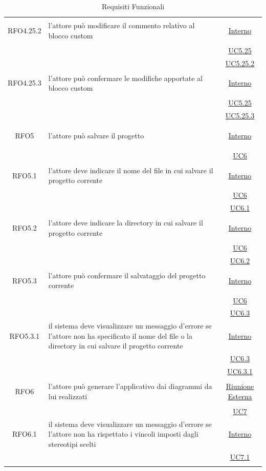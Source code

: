 \begin{longtable}{|c|>{\centering}m{7cm}|c|}
\hypertarget{RFO4.25.2}{RFO4.25.2} & l'attore può modificare il commento relativo al blocco custom &  \hyperlink{Interno}{Interno}\\
& &\hyperref[UC5.25]{UC5.25}\\
& &\hyperref[UC5.25.2]{UC5.25.2}\\ \hline

\hypertarget{RFO4.25.3}{RFO4.25.3} & l'attore può confermare le modifiche apportate al blocco custom &  \hyperlink{Interno}{Interno}\\
& &\hyperref[UC5.25]{UC5.25}\\
& &\hyperref[UC5.25.3]{UC5.25.3}\\ \hline

\hypertarget{RFO5}{RFO5} & l'attore può salvare il progetto &  \hyperlink{Interno}{Interno}\\
& & \hyperref[UC6]{UC6}\\ \hline

\hypertarget{RFO5.1}{RFO5.1} & l'attore deve indicare il nome del file in cui salvare il progetto corrente&  \hyperlink{Interno}{Interno}\\
& & \hyperref[UC6]{UC6}\\
& & \hyperref[UC6.1]{UC6.1}\\ \hline

\hypertarget{RFO5.2}{RFO5.2} & l'attore deve indicare la directory in cui salvare il progetto corrente&  \hyperlink{Interno}{Interno}\\
& & \hyperref[UC6]{UC6}\\
& & \hyperref[UC6.2]{UC6.2}\\ \hline

\hypertarget{RFO5.3}{RFO5.3} & l'attore può confermare il salvataggio del progetto corrente &  \hyperlink{Interno}{Interno}\\
& & \hyperref[UC6]{UC6}\\
& & \hyperref[UC6.3]{UC6.3}\\ \hline

\hypertarget{RFO5.3.1}{RFO5.3.1} & il sistema deve visualizzare un messaggio d'errore se l'attore non ha specificato il nome del file o la directory in cui salvare il progetto corrente &  \hyperlink{Interno}{Interno}\\
& & \hyperref[UC6.3]{UC6.3}\\
& & \hyperref[UC6.3.1]{UC6.3.1}\\ \hline

\hypertarget{RFO6}{RFO6} & l'attore può generare l'applicativo dai diagrammi da lui realizzati & \hyperlink{Riunione Esterna}{Riunione Esterna}\\
& & \hyperref[UC7]{UC7}\\ \hline

\hypertarget{RFO6.1}{RFO6.1} & il sistema deve visualizzare un messaggio d'errore se l'attore non ha rispettato i vincoli imposti dagli stereotipi scelti& \hyperlink{Interno}{Interno}\\
& & \hyperref[UC7.1]{UC7.1}\\ \hline

\caption[Requisiti Funzionali]{Requisiti Funzionali}
\label{tabella:req0}
\end{longtable}
\clearpage

